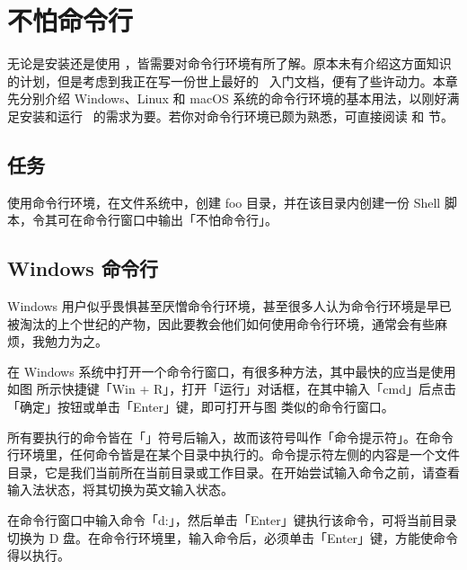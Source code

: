 \chapter[Installation]{不怕命令行}

无论是安装还是使用 \ConTeXt，皆需要对命令行环境有所了解。原本未有介绍这方面知识的计划，但是考虑到我正在写一份世上最好的 \ConTeXt\ 入门文档，便有了些许动力。本章先分别介绍 Windows、Linux 和 macOS 系统的命令行环境的基本用法，以刚好满足安装和运行 \ConTeXt\ 的需求为要。若你对命令行环境已颇为熟悉，可直接阅读 \in[installation] 和  节。

\section{任务}

使用命令行环境，在文件系统中，创建 foo 目录，并在该目录内创建一份 Shell 脚本，令其可在命令行窗口中输出「不怕命令行」。

\section{Windows 命令行}

Windows 用户似乎畏惧甚至厌憎命令行环境，甚至很多人认为命令行环境是早已被淘汰的上个世纪的产物，因此要教会他们如何使用命令行环境，通常会有些麻烦，我勉力为之。

在 Windows 系统中打开一个命令行窗口，有很多种方法，其中最快的应当是使用如图 \in[win-r] 所示快捷键「Win + R」，打开「运行」对话框，在其中输入「cmd」后点击「确定」按钮或单击「Enter」键，即可打开与图  类似的命令行窗口。

\startplacefigure[location=none]
\startfloatcombination[nx=2,ny=1]
\startplacefigure[title={「\type{Win + R}」 组合键},reference=win-r]
\stopplacefigure
\startplacefigure[title={Windows 命令行窗口},reference=cmd-window]
\stopplacefigure
\stopfloatcombination
\stopplacefigure

所有要执行的命令皆在「\type{>}」符号后输入，故而该符号叫作「命令提示符」。在命令行环境里，任何命令皆是在某个目录中执行的。命令提示符左侧的内容是一个文件目录，它是我们当前所在当前目录或工作目录。在开始尝试输入命令之前，请查看输入法状态，将其切换为英文输入状态。

在命令行窗口中输入命令「d:」，然后单击「Enter」键执行该命令，可将当前目录切换为 D 盘。在命令行环境里，输入命令后，必须单击「Enter」键，方能使命令得以执行。

